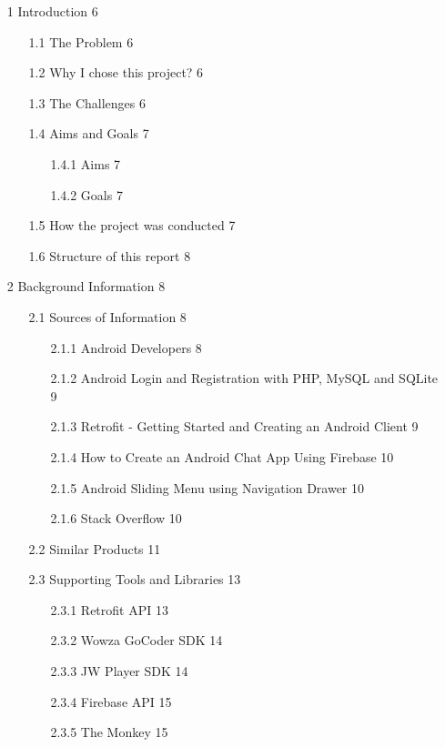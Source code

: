 \documentclass{article}
\begin{document}
\begin{itemize}
    	\item [1] Introduction \hfill6
	\begin{itemize}
		\item [1.1] The Problem  \hfill6
		\item [1.2] Why I chose this project? \hfill6
		\item [1.3] The Challenges \hfill6
		\item [1.4] Aims and Goals  \hfill7
		\begin{itemize}
			\item [1.4.1] Aims \hfill7
			\item [1.4.2] Goals \hfill7
		\end{itemize}
		\item [1.5] How the project was conducted \hfill7
		\item [1.6] Structure of this report \hfill8
	\end{itemize}
    	\item [2] Background Information \hfill8
	\begin{itemize}
		\item [2.1] Sources of Information \hfill8
		\begin{itemize}
			\item [2.1.1] Android Developers \hfill8
			\item [2.1.2] Android Login and Registration with PHP, MySQL and SQLite \hfill9
			\item [2.1.3] Retrofit - Getting Started and Creating an Android Client \hfill9
			\item [2.1.4] How to Create an Android Chat App Using Firebase \hfill10
			\item [2.1.5] Android Sliding Menu using Navigation Drawer \hfill10
			\item [2.1.6] Stack Overflow \hfill10
		\end{itemize}
		\item [2.2] Similar Products \hfill11
		\item [2.3] Supporting Tools and Libraries \hfill13
		\begin{itemize}
			\item [2.3.1] Retrofit API \hfill13
			\item [2.3.2] Wowza GoCoder SDK \hfill14
			\item [2.3.3] JW Player SDK \hfill14 
			\item [2.3.4] Firebase API \hfill15
			\item [2.3.5] The Monkey \hfill15

\end{itemize}
\end{itemize}
\end{itemize}
\end{document}

